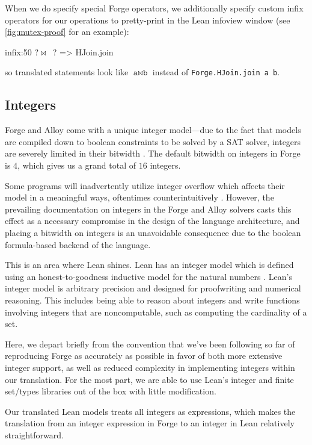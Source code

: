 When we do specify special Forge operators, we additionally specify custom infix operators for our operations to pretty-print in the Lean infoview window (see \cref{fig:mutex-proof} for an example): 
\begin{leanimpl*}
infix:50 ?\texttt{\textquotedbl }$\bowtie$\texttt{ \textquotedbl}?  => HJoin.join
\end{leanimpl*}
so translated statements look like $\texttt{a}\bowtie\texttt{b}$ instead of \texttt{Forge.HJoin.join a b}. 

\subsection{Integers}\label{sec:integers}
Forge and Alloy come with a unique integer model---due to the fact that models are compiled down to boolean constraints to be solved by a SAT solver, integers are severely limited in their bitwidth \cite{jackson2012software,nelson2024artifact}. The default bitwidth on integers in Forge is $4$, which gives us a grand total of $16$ integers. 

Some programs will inadvertently utilize integer overflow which affects their model in a meaningful ways, oftentimes counterintuitively \cite[22]{ngpdbccdlrrvwwk-oopsla-2024}. However, the prevailing documentation on integers in the Forge and Alloy solvers casts this effect as a necessary compromise in the design of the language architecture, and placing a bitwidth on integers is an unavoidable consequence due to the boolean formula-based backend of the language. 

This is an area where Lean shines. Lean has an integer model which is defined using an honest-to-goodness inductive model for the natural numbers \cite{avigad2024theorem}. Lean's integer model is arbitrary precision and designed for proofwriting and numerical reasoning. This includes being able to reason about integers and write functions involving integers that are noncomputable, such as computing the cardinality of a set. 

Here, we depart briefly from the convention that we've been following so far of reproducing Forge as accurately as possible in favor of both more extensive integer support, as well as reduced complexity in implementing integers within our translation. For the most part, we are able to use Lean's integer and finite set/types libraries out of the box with little modification. 

Our translated Lean models treats all integers as expressions, which makes the translation from an integer expression in Forge to an integer in Lean relatively straightforward. 

